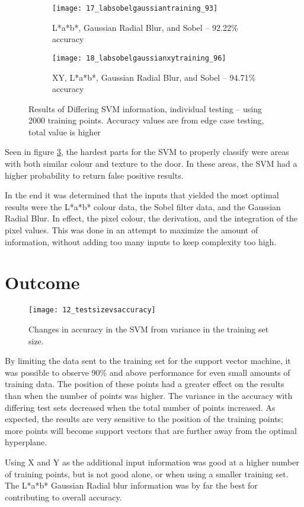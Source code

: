 \begin{figure}
        \begin{subfigure}[b]{0.3\textwidth}
                \centering
                \texttt{[image: 17\_labsobelgaussiantraining\_93]}
                \caption{L*a*b*, Gaussian Radial Blur, and Sobel -- 92.22\% accuracy}
                \label{fig:17_labsobelgaussiantraining_93}
        \end{subfigure}
        \begin{subfigure}[b]{0.3\textwidth}
                \centering
                \texttt{[image: 18\_labsobelgaussianxytraining\_96]}
                \caption{XY, L*a*b*, Gaussian Radial Blur, and Sobel -- 94.71\% accuracy}
                \label{fig:18_labsobelgaussianxytraining_96}
        \end{subfigure}
        \caption{Results of Differing SVM information, individual testing -- using 2000 training points. Accuracy values are from edge case testing, total value is higher}\label{fig:labResults}
\end{figure}

Seen in figure \ref{fig:labResults}, the hardest parts for the SVM to properly classify were areas with both similar colour and texture to the door. In these areas, the SVM had a higher probability to return false positive results.

In the end it was determined that the inputs that yielded the most optimal results were the L*a*b* colour data, the Sobel filter data, and the Gaussian Radial Blur. In effect, the pixel colour, the derivation, and the integration of the pixel values. This was done in an attempt to maximize the amount of information, without adding too many inputs to keep complexity too high.

\section{Outcome}

\begin{figure}[ht]
    \centering
    \texttt{[image: 12\_testsizevsaccuracy]}
    \caption{Changes in accuracy in the SVM from variance in the training set size.}
    \label{fig:12_testsizevsaccuracy}
\end{figure}

By limiting the data sent to the training set for the support vector machine, it was possible to observe 90\% and above performance for even small amounts of training data. The position of these points had a greater effect on the results than when the number of points was higher. The variance in the accuracy with differing test sets decreased when the total number of points increased. As expected, the results are very sensitive to the position of the training points; more points will become support vectors that are further away from the optimal hyperplane.

Using X and Y as the additional input information was good at a higher number of training points, but is not good alone, or when using a smaller training set. The L*a*b* Gaussian Radial blur information was by far the best for contributing to overall accuracy.

